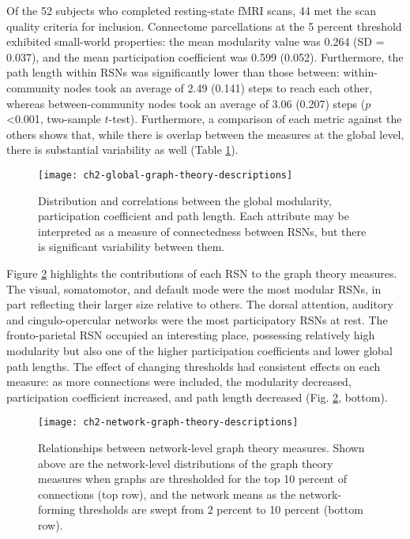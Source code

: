 \begin{itmeize}
Of the 52 subjects who completed resting-state fMRI scans, 44 met the scan quality criteria for inclusion. Connectome parcellations at the 5 percent threshold exhibited small-world properties: the mean modularity value was 0.264 (SD = 0.037), and the mean participation coefficient was 0.599 (0.052). Furthermore, the path length within RSNs was significantly lower than those between: within-community nodes took an average of 2.49 (0.141) steps to reach each other, whereas between-community nodes took an average of 3.06 (0.207) steps ($p$ \textless 0.001, two-sample $t$-test). Furthermore, a comparison of each metric against the others shows that, while there is overlap between the measures at the global level, there is substantial variability as well (Table \ref{fig:ch2-global-graph-theory-descriptions}).

\begin{figure}[t]
    \centering
    \texttt{[image: ch2-global-graph-theory-descriptions]}
    \caption[Distribution and correlations between global graph theory measures.]{Distribution and correlations between the global modularity, participation coefficient and path length. Each attribute may be interpreted as a measure of connectedness between RSNs, but there is significant variability between them.}
    \label{fig:ch2-global-graph-theory-descriptions}
\end{figure}

Figure \ref{fig:ch2-network-graph-theory-descriptions} highlights the contributions of each RSN to the graph theory measures. The visual, somatomotor, and default mode were the most modular RSNs, in part reflecting their larger size relative to others. The dorsal attention, auditory and cingulo-opercular networks were the most participatory RSNs at rest. The fronto-parietal RSN occupied an interesting place, possessing relatively high modularity but also one of the higher participation coefficients and lower global path lengths. The effect of changing thresholds had consistent effects on each measure: as more connections were included, the modularity decreased, participation coefficient increased, and path length decreased (Fig.  \ref{fig:ch2-network-graph-theory-descriptions}, bottom). 

\begin{figure}[t]
    \centering
    \texttt{[image: ch2-network-graph-theory-descriptions]}
    \caption[Relationships between network-level graph theory measures.]{Relationships between network-level graph theory measures. Shown above are the network-level distributions of the graph theory measures when graphs are thresholded for the top 10 percent of connections (top row), and the network means as the network-forming thresholds are swept from 2 percent to 10 percent (bottom row).}
    \label{fig:ch2-network-graph-theory-descriptions}
\end{figure}


\end{itmeize}
